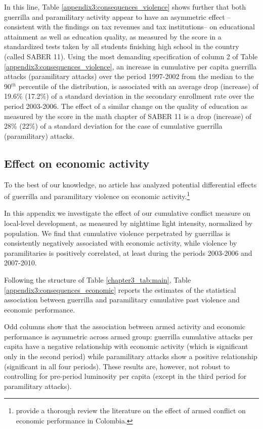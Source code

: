 In this line, Table \ref{appendix3:consequences_violence} shows further that both guerrilla and paramilitary activity appear to have an asymmetric effect --consistent with the findings on tax revenues and tax institutions-- on educational attainment as well as education quality, as measured by the score in a standardized tests taken by all students finishing high school in the country (called SABER 11). Using the most demanding specification of column 2 of Table \ref{appendix3:consequences_violence}, an increase in cumulative per capita guerrilla attacks (paramilitary attacks) over the period 1997-2002 from the median to the 90$^{th}$ percentile of the distribution, is associated with an average drop (increase) of 19.6\% (17.2\%) of a standard deviation in the secondary enrollment rate over the period 2003-2006. The effect of a similar change on the quality of education as measured by the score in the math chapter of SABER 11 is a drop (increase) of 28\% (22\%) of a standard deviation for the case of cumulative guerrilla (paramilitary) attacks.

\subsection{Effect on economic activity \label{appendix3:effect_economic}}

To the best of our knowledge, no article has analyzed potential differential effects of guerrilla and paramilitary violence on economic activity.\footnote{\citet{riascosvargas2011} provide a thorough review the literature on the effect of armed conflict on economic performance in Colombia.}

In this appendix we investigate the effect of our cumulative conflict measure on local-level development, as measured by nighttime light  intensity, normalized by population. We find that cumulative violence perpetrated by guerrillas is consistently negatively associated with economic activity, while violence by paramilitaries is positively correlated, at least during the periods 2003-2006 and 2007-2010. 

Following the structure of Table \ref{chapter3_tab:main}, Table \ref{appendix3:consequences_economic} reports the estimates of the statistical association between guerrilla and paramilitary cumulative past violence and economic performance.

Odd columns show that the association between armed activity and economic performance is asymmetric across armed group: guerrilla cumulative attacks per capita have a negative relationship with economic activity (which is significant only in the second period) while paramilitary attacks show a positive
relationship (significant in all four periods). These results are, however, not robust to controlling for pre-period luminosity per capita (except in the third period for paramilitary attacks).

